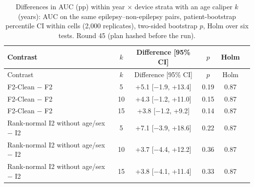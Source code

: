 {\scriptsize
\begin{longtable}{p{}ccccc}
\caption{Differences in AUC (pp) within year $\times$ device strata with an age caliper $k$ (years): AUC on the same epilepsy--non-epilepsy pairs, patient-bootstrap percentile CI within cells (2,000 replicates), two-sided bootstrap $p$, Holm over six tests. Round 45 (plan hashed before the run).}\label{tab:s2_p45a}\\
\toprule
Contrast & $k$ & Difference [95\% CI] & $p$ & Holm \\
\midrule
\endfirsthead
\toprule
Contrast & $k$ & Difference [95\% CI] & $p$ & Holm \\
\midrule
\endhead
\bottomrule
\endfoot
F2-Clean $-$ F2 & 5 & +5.1 [$-$1.9, +13.4] & 0.19 & 0.87 \\
F2-Clean $-$ F2 & 10 & +4.3 [$-$1.2, +11.0] & 0.15 & 0.87 \\
F2-Clean $-$ F2 & 15 & +3.8 [$-$1.2, +9.2] & 0.14 & 0.87 \\
Rank-normal I2 without age/sex $-$ I2 & 5 & +7.1 [$-$3.9, +18.6] & 0.22 & 0.87 \\
Rank-normal I2 without age/sex $-$ I2 & 10 & +3.7 [$-$4.4, +12.2] & 0.36 & 0.87 \\
Rank-normal I2 without age/sex $-$ I2 & 15 & +3.8 [$-$4.1, +11.4] & 0.33 & 0.87 \\
\end{longtable}
}
